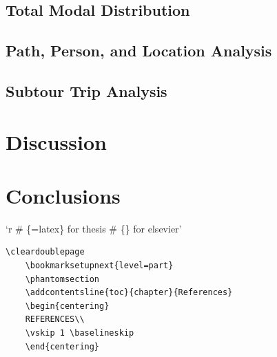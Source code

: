 \documentclass[3p, authoryear, review]{elsarticle} %
\newlength{\cslhangindent}
\newlength{\cslentryspacingunit} %
\newenvironment{CSLReferences}[2] %
 {%
  \setlength{\parindent}{0pt}
  \ifodd #1
  \let\oldpar\par
  \def\par{\hangindent=\cslhangindent\oldpar}
  \fi
  \setlength{\parskip}{#2\cslentryspacingunit}
 }%
 {}
\begin{document}
\hypertarget{total-modal-distribution}{%
\subsection{Total Modal Distribution}\label{total-modal-distribution}}

\hypertarget{path-person-and-location-analysis}{%
\subsection{Path, Person, and Location Analysis}\label{path-person-and-location-analysis}}

\hypertarget{subtour-trip-analysis}{%
\subsection{Subtour Trip Analysis}\label{subtour-trip-analysis}}

\hypertarget{discussion}{%
\section{Discussion}\label{discussion}}

\hypertarget{conclusions}{%
\section{Conclusions}\label{conclusions}}

`r
\# \{=latex\} for thesis
\# \{\} for elsevier'

\begin{verbatim}
\cleardoublepage
    \bookmarksetupnext{level=part}
    \phantomsection
    \addcontentsline{toc}{chapter}{References}
    \begin{centering}
    REFERENCES\\
    \vskip 1 \baselineskip
    \end{centering}
    
\end{verbatim}

\hypertarget{refs}{}
\begin{CSLReferences}{0}{0}
\end{CSLReferences}


\end{document}
